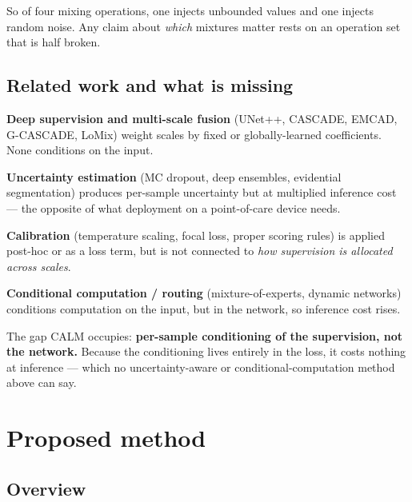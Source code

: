 \documentclass[11pt,a4paper]{article}
\begin{document}
So of four mixing operations, one injects unbounded values and one injects
random noise. Any claim about \emph{which} mixtures matter rests on an operation
set that is half broken.

\subsection{Related work and what is missing}

\textbf{Deep supervision and multi-scale fusion} (UNet++, CASCADE, EMCAD,
G-CASCADE, LoMix) weight scales by fixed or globally-learned coefficients. None
conditions on the input.

\textbf{Uncertainty estimation} (MC dropout, deep ensembles, evidential
segmentation) produces per-sample uncertainty but at multiplied inference cost
--- the opposite of what deployment on a point-of-care device needs.

\textbf{Calibration} (temperature scaling, focal loss, proper scoring rules) is
applied post-hoc or as a loss term, but is not connected to \emph{how
supervision is allocated across scales}.

\textbf{Conditional computation / routing} (mixture-of-experts, dynamic
networks) conditions computation on the input, but in the network, so inference
cost rises.

The gap CALM occupies: \textbf{per-sample conditioning of the supervision, not
the network.} Because the conditioning lives entirely in the loss, it costs
nothing at inference --- which no uncertainty-aware or conditional-computation
method above can say.

\section{Proposed method}

\subsection{Overview}
\end{document}
